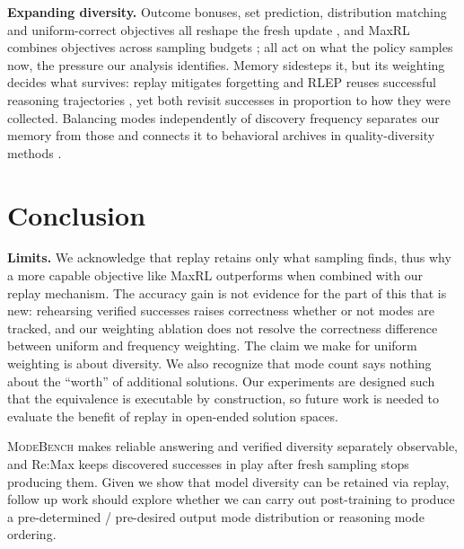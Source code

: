 \documentclass{article}
\newcommand{\1}{\mathbf 1}
\newcommand{\mb}{\textsc{ModeBench}}
\theoremstyle{remark}
\theoremstyle{definition}
\theoremstyle{plain}
\begin{document}
\textbf{Expanding diversity.}
Outcome bonuses, set prediction, distribution matching and uniform-correct objectives all reshape the fresh update \citep{song2025outcome,chen2025passktraining,li2025divergence,li2026setpo,li2026distribution,lochab2026ucpo}, and MaxRL combines objectives across sampling budgets \citep{tajwar2026maxrl};
all act on what the policy samples now, the pressure our analysis
identifies.
Memory sidesteps it, but its weighting decides what survives: replay mitigates forgetting \citep{lin1992selfimproving,rolnick2019replay} and RLEP reuses successful reasoning trajectories \citep{zhang2025rlep}, yet both revisit successes in proportion to how they were collected.
Balancing modes independently of discovery frequency separates our memory from those and connects it to behavioral archives in quality-diversity methods \citep{mouret2015illuminating,ecoffet2021return}.


\section{Conclusion}
\label{sec:conclusion}
\label{sec:discussion}
\label{sec:limitations}

\textbf{Limits.} We acknowledge that replay retains only what sampling finds, thus why a more capable objective like MaxRL outperforms when combined with our replay mechanism. The accuracy gain is not evidence for the part of this that is new: rehearsing verified successes raises correctness whether or not modes are tracked, and our weighting ablation does not resolve the correctness difference between uniform and frequency weighting. The claim we make for uniform weighting is about diversity. We also recognize that mode count says nothing about the ``worth'' of additional solutions. Our experiments are designed such that the equivalence is executable by construction, so future work is needed to evaluate the benefit of replay in open-ended solution spaces.

\mb{} makes reliable answering and verified diversity separately observable, and Re:Max keeps discovered successes in play after fresh sampling stops producing them. Given we show that model diversity can be retained via replay, follow up work should explore whether we can carry out post-training to produce a pre-determined / pre-desired output mode distribution or reasoning mode ordering.

\label{sec:main-end}
\clearpage
\end{document}
